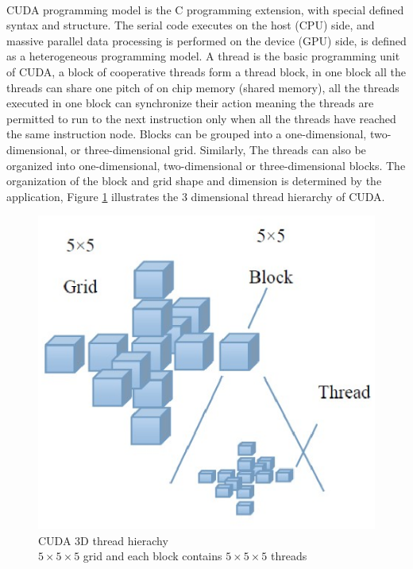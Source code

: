 \documentclass[12pt,a4paper,final]{article}
\begin{document}
\begin{spacing}{2.5}
\paragraph{}CUDA programming model is the C programming extension, with special defined syntax and structure. The serial code executes on the host (CPU) side, and massive parallel data processing is performed on the device (GPU) side, is defined as a heterogeneous programming model. A thread is the basic programming unit of CUDA, a block of cooperative threads form a thread block, in one block all the threads can share one pitch of on chip memory (shared memory), all the threads executed in one block can synchronize their action meaning the threads are permitted to run to the next instruction only when all the threads have reached the same instruction node. Blocks can be grouped into a one-dimensional, two-dimensional, or three-dimensional grid. Similarly, The threads can also be organized into one-dimensional, two-dimensional or three-dimensional blocks. The organization of the block and grid shape and dimension is determined by the application, Figure \ref{figure1} illustrates the 3 dimensional thread hierarchy of CUDA.
\begin{figure}[htb]
\centering
\includegraphics[scale=0.5]{CUDA_programming_hierachy.eps}
\caption{CUDA 3D thread hierachy\\ $5\times 5\times 5$ grid and each block contains $5\times 5\times 5$ threads\\}
\label{figure1}
\end{figure}


\end{spacing}
\end{document}
